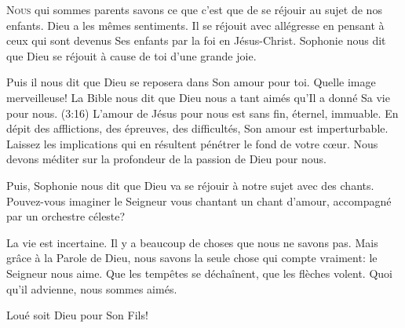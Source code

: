 



\lettrine{N}{ous} qui sommes parents savons ce que c'est que de se réjouir
 au sujet de nos enfants. Dieu a les mêmes sentiments.
 Il se réjouit avec allégresse en pensant à ceux qui sont devenus
 Ses enfants par la foi en Jésus-Christ. Sophonie nous dit que
 \Og Dieu se réjouit à cause de toi d'une grande joie. \Fg{}

Puis il nous dit que Dieu \Og se reposera dans Son amour pour toi. \Fg{}
 Quelle image merveilleuse! La Bible nous dit que Dieu nous a tant aimés
 qu'Il a donné Sa vie pour nous. (3:16)
 L'amour de Jésus pour nous est sans fin, éternel, immuable.
 En dépit des afflictions, des épreuves, des difficultés,
 Son amour est imperturbable. Laissez les implications qui en résultent
 pénétrer le fond de votre c\oe{}ur.
 Nous devons méditer sur la profondeur de la passion de Dieu pour nous. 


Puis, Sophonie nous dit que Dieu va \Og se réjouir à notre sujet
 avec des chants. \Fg{} Pouvez-vous imaginer le Seigneur vous chantant
 un chant d'amour, accompagné par un orchestre céleste? 

La vie est incertaine. Il y a beaucoup de choses que nous ne savons pas.
 Mais grâce à la Parole de Dieu, nous savons la seule chose
 qui compte vraiment: le Seigneur nous aime. Que les tempêtes se déchaînent,
 que les flèches volent. Quoi qu'il advienne, nous sommes aimés. 

Loué soit Dieu pour Son Fils! 

\dvrule




